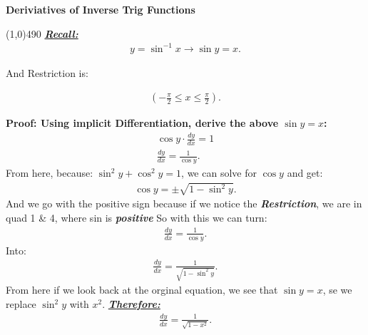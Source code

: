 \documentclass{report}
\begin{document}
  \pagebreak \bigbreak \noindent
  \begin{mdframed}
  \begin{large}
      \begin{center}
          \textbf{Deriviatives of Inverse Trig Functions}
      \end{center}
  \end{large}
  \end{mdframed}
  \line(1,0){490}
  \bigbreak \noindent \bigbreak \noindent
  \textbf{\textit{\underline{Recall:}}}
  \begin{align*}
    y = \sin^{-1}{x} \longrightarrow \sin{y} = x
  .\end{align*}
  \begin{center}
    And Restriction is:
  \end{center}
  \begin{align*}
    (-\frac{\pi}{2} \leq x \leq \frac{\pi}{2})
  .\end{align*}
  \bigbreak \noindent 
  \begin{mdframed}
    \textbf{Proof: Using implicit Differentiation, derive the above $\sin{y} =x$:}
    \begin{align*}
      \cos{y} \cdot \frac{dy}{dx} = 1 \\
      \frac{dy}{dx} = \frac{1}{\cos{y}}
    .\end{align*}
    From here, because: $\sin^{2}{y} + \cos^{2}{y} = 1$, we can solve for $\cos{y}$ and get:
    \begin{align*}
      \cos{y} = \pm\sqrt{1-\sin^{2}{y}}
    .\end{align*}
    And we go with the positive sign because if we notice the \textbf{\textit{Restriction}}, we are in quad 1 \& 4, where sin is \textbf{\textit{positive}}
    \bigbreak \noindent 
    So with this we can turn:
    \begin{align*}
      \frac{dy}{dx} = \frac{1}{\cos{y}}
    .\end{align*}
    Into:
    \begin{align*}
      \frac{dy}{dx} = \frac{1}{\sqrt{1-\sin^{2}{y}}}
    .\end{align*}
    From here if we look back at the orginal equation, we see that $\sin{y} = x$, se we replace $\sin^{2}{y}$ with $x^{2}$.
    \textbf{\textit{\underline{Therefore:}}}
    \begin{align*}
      \frac{dy}{dx} = \frac{1}{\sqrt{1-x^{2}}}
    .\end{align*}
  \end{mdframed}
  
\end{document}
